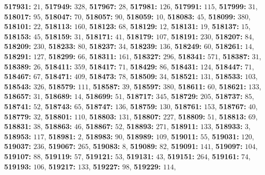\textsf{\bfseries 517931:} $21$, \textsf{\bfseries 517949:} $328$, \textsf{\bfseries 517967:} $28$, \textsf{\bfseries 517981:} $126$, \textsf{\bfseries 517991:} $115$, \textsf{\bfseries 517999:} $31$, \textsf{\bfseries 518017:} $95$, \textsf{\bfseries 518047:} $70$, \textsf{\bfseries 518057:} $90$, \textsf{\bfseries 518059:} $10$, \textsf{\bfseries 518083:} $45$, \textsf{\bfseries 518099:} $380$, \textsf{\bfseries 518101:} $22$, \textsf{\bfseries 518113:} $160$, \textsf{\bfseries 518123:} $68$, \textsf{\bfseries 518129:} $12$, \textsf{\bfseries 518131:} $19$, \textsf{\bfseries 518137:} $15$, \textsf{\bfseries 518153:} $45$, \textsf{\bfseries 518159:} $31$, \textsf{\bfseries 518171:} $41$, \textsf{\bfseries 518179:} $107$, \textsf{\bfseries 518191:} $230$, \textsf{\bfseries 518207:} $84$, \textsf{\bfseries 518209:} $230$, \textsf{\bfseries 518233:} $80$, \textsf{\bfseries 518237:} $34$, \textsf{\bfseries 518239:} $136$, \textsf{\bfseries 518249:} $60$, \textsf{\bfseries 518261:} $14$, \textsf{\bfseries 518291:} $127$, \textsf{\bfseries 518299:} $66$, \textsf{\bfseries 518311:} $161$, \textsf{\bfseries 518327:} $296$, \textsf{\bfseries 518341:} $571$, \textsf{\bfseries 518387:} $31$, \textsf{\bfseries 518389:} $26$, \textsf{\bfseries 518411:} $359$, \textsf{\bfseries 518417:} $71$, \textsf{\bfseries 518429:} $86$, \textsf{\bfseries 518431:} $124$, \textsf{\bfseries 518447:} $71$, \textsf{\bfseries 518467:} $67$, \textsf{\bfseries 518471:} $409$, \textsf{\bfseries 518473:} $78$, \textsf{\bfseries 518509:} $34$, \textsf{\bfseries 518521:} $131$, \textsf{\bfseries 518533:} $103$, \textsf{\bfseries 518543:} $326$, \textsf{\bfseries 518579:} $111$, \textsf{\bfseries 518587:} $39$, \textsf{\bfseries 518597:} $380$, \textsf{\bfseries 518611:} $60$, \textsf{\bfseries 518621:} $133$, \textsf{\bfseries 518657:} $31$, \textsf{\bfseries 518689:} $14$, \textsf{\bfseries 518699:} $51$, \textsf{\bfseries 518717:} $345$, \textsf{\bfseries 518729:} $205$, \textsf{\bfseries 518737:} $85$, \textsf{\bfseries 518741:} $52$, \textsf{\bfseries 518743:} $65$, \textsf{\bfseries 518747:} $136$, \textsf{\bfseries 518759:} $130$, \textsf{\bfseries 518761:} $153$, \textsf{\bfseries 518767:} $40$, \textsf{\bfseries 518779:} $32$, \textsf{\bfseries 518801:} $110$, \textsf{\bfseries 518803:} $131$, \textsf{\bfseries 518807:} $227$, \textsf{\bfseries 518809:} $51$, \textsf{\bfseries 518813:} $69$, \textsf{\bfseries 518831:} $38$, \textsf{\bfseries 518863:} $46$, \textsf{\bfseries 518867:} $52$, \textsf{\bfseries 518893:} $271$, \textsf{\bfseries 518911:} $133$, \textsf{\bfseries 518933:} $3$, \textsf{\bfseries 518953:} $117$, \textsf{\bfseries 518981:} $2$, \textsf{\bfseries 518983:} $90$, \textsf{\bfseries 518989:} $109$, \textsf{\bfseries 519011:} $55$, \textsf{\bfseries 519031:} $120$, \textsf{\bfseries 519037:} $236$, \textsf{\bfseries 519067:} $265$, \textsf{\bfseries 519083:} $8$, \textsf{\bfseries 519089:} $82$, \textsf{\bfseries 519091:} $141$, \textsf{\bfseries 519097:} $104$, \textsf{\bfseries 519107:} $88$, \textsf{\bfseries 519119:} $57$, \textsf{\bfseries 519121:} $53$, \textsf{\bfseries 519131:} $43$, \textsf{\bfseries 519151:} $264$, \textsf{\bfseries 519161:} $74$, \textsf{\bfseries 519193:} $106$, \textsf{\bfseries 519217:} $133$, \textsf{\bfseries 519227:} $98$, \textsf{\bfseries 519229:} $114$, 
